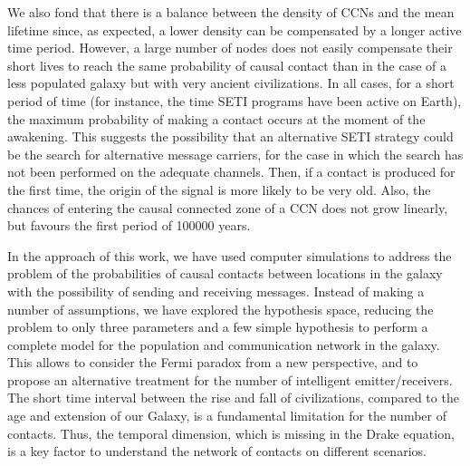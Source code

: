 \documentclass[crop]{CSLB}
\newcommand{\ceti}{CCN}
\newcommand{\cetis}{CCNs}
\begin{document}

We also fond that there 
is a balance between the density of \cetis{} and the mean
lifetime since, as expected, a lower density can be compensated by a
longer active time period.
%
However, a large number of nodes does not easily compensate their
short lives to reach the same probability of causal contact than in
the case of a less populated galaxy but with very ancient
civilizations.
%
In all cases, for a short period of time (for instance, the time SETI
programs have been active on Earth), the maximum probability of making
a contact occurs at the moment of the awakening.
%
This suggests the possibility that an alternative SETI strategy could
be the search for alternative message carriers, for the case in which
the search has not been performed on the adequate channels.
%
Then, if a contact is produced for the first time, the origin of the
signal is more likely to be very old.
%
Also, the chances of entering the causal connected zone of a \ceti{}
does not grow linearly, but favours the first period of 100000 years.






In the approach of this work, we have used computer simulations to address
the problem of the probabilities of causal contacts between locations
in the galaxy with the possibility of sending and receiving messages.
%
Instead of making a number of assumptions, we have explored the
hypothesis space, reducing the problem to only three parameters and a
few simple hypothesis to perform a complete model for the population and
communication network in the galaxy.
%
This allows to consider the Fermi paradox from a new perspective, and
to propose an alternative treatment for the number of intelligent
emitter/receivers.
%
The short time interval between the
rise and fall of civilizations, compared to the age and extension of
our Galaxy, is a fundamental limitation for the number of contacts.
%
Thus, the temporal dimension, which is missing in the Drake
equation, is a key factor to understand the network of contacts on
different scenarios.









\setlength{\bibsep}{0.0pt}

\end{document}
